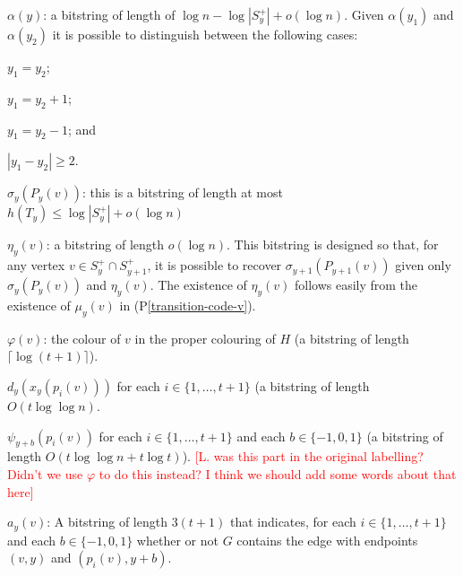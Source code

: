 \documentclass{patmorin}
\newcommand{\pref}[1]{(P\ref{#1})}
\begin{document}
\begin{compactenum}[(L1)]
    \item $\alpha(y)$: a bitstring of length of $\log n-\log |S^+_y|+o(\log n)$.  Given $\alpha(y_1)$ and $\alpha(y_2)$ it is possible to distinguish between the following cases:
    \begin{inparaenum}
        \item $y_1=y_2$;
        \item $y_1=y_2+1$;
        \item $y_1=y_2-1$; and
        \item $|y_1-y_2|\ge 2$.
    \end{inparaenum}

    \item $\sigma_y(P_y(v))$: this is a bitstring of length at most $h(T_y)\le \log|S^+_y| + o(\log n)$

    \item $\eta_y(v)$: a bitstring of length $o(\log n)$.  This bitstring is designed so that, for any vertex $v\in S^+_y\cap S^+_{y+1}$, it is possible to recover $\sigma_{y+1}(P_{y+1}(v))$ given only $\sigma_y(P_y(v))$ and $\eta_y(v)$.  The existence of $\eta_y(v)$ follows easily from the existence of $\mu_y(v)$ in \pref{transition-code-v}.

    \item $\varphi(v)$: the colour of $v$ in the proper colouring of $H$ (a bitstring of length $\lceil\log(t+1)\rceil$).

    \item $d_y(x_y(p_i(v)))$ for each $i\in\{1,\ldots,t+1\}$ (a bitstring of length $O(t\log\log n)$.

    \item $\psi_{y+b}(p_i(v))$ for each $i\in\{1,\ldots,t+1\}$ and each $b\in\{-1,0,1\}$ (a bitstring of length $O(t\log\log n + t\log t)$).\label{psi} \textcolor{red}{[L. was this part in the original labelling? Didn't we use $\varphi$ to do this instead? I think we should add some words about that here]}

    \item $a_y(v)$: A bitstring of length $3(t+1)$ that indicates, for each $i\in\{1,\ldots,t+1\}$ and each $b\in\{-1,0,1\}$ whether or not $G$ contains the edge with endpoints $(v,y)$ and $(p_i(v),y+b)$.
\end{compactenum}
\end{document}
